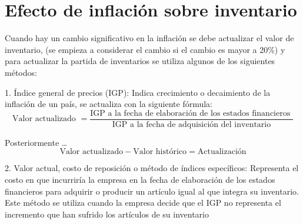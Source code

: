 \documentclass{article}
\begin{document}
\section{Efecto de inflación sobre inventario}
Cuando hay un cambio significativo en la inflación se debe actualizar el valor de inventario, (se empieza a considerar el cambio si el cambio es mayor a 20\%) y para actualizar la partida de inventarios se utiliza algunos de los siguientes métodos:

1. Índice general de precios (IGP): Indica crecimiento o decaimiento de la inflación de un país, se actualiza con la siguiente fórmula: 
\[
   \text{Valor actualizado } =  \frac{\text{IGP a la fecha de elaboración de los estados financieros }}{\text{IGP a la fecha de adquisición del inventario}}
\]

Posteriormente \dots 
\[
  \text{Valor actualizado} - \text{Valor histórico} = \text{Actualización}
\]

2. Valor actual, costo de reposición o método de índices específicos: 
Representa el costo en que incurriría la empresa en la fecha de elaboración de los estados financieros para adquirir o producir un artículo igual al que integra su inventario. Este método se utiliza cuando la empresa decide que el IGP no representa el incremento que han sufrido los artículos de su inventario
\end{document}
